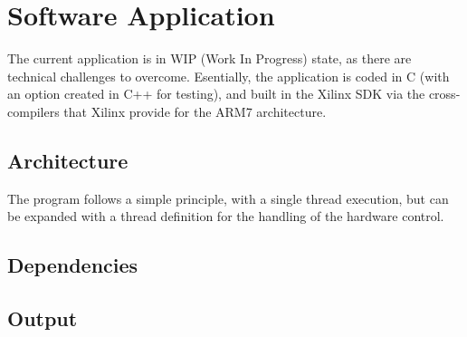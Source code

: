 
\chapter{Software Application} \label{software-application}

The current application is in WIP (Work In Progress) state, as there are technical challenges to
overcome. Esentially, the application is coded in C (with an option created in C++ for testing), and
built in the Xilinx SDK via the cross-compilers that Xilinx provide for the ARM7 architecture.

\section{Architecture}

The program follows a simple principle, with a single thread execution, but can be expanded with a
thread definition for the handling of the hardware control.


\section{Dependencies}

\section{Output}

